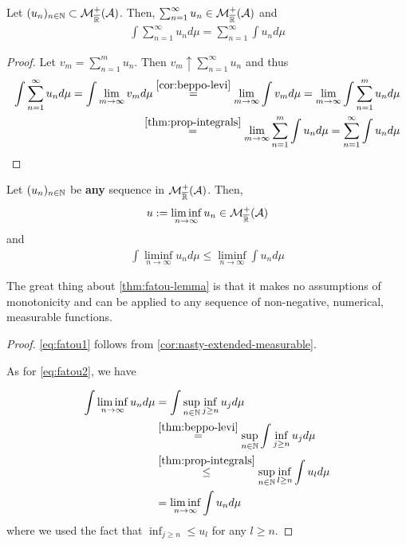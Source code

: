\begin{cor}
	\label{cor:integral-countable-sum}
	Let $(u_n)_{n\in\mathbb{N}} \subset \mathcal{M}^+_{\overline{\mathbb{R}}}(\mathcal{A})$. Then, $\sum_{n = 1}^{\infty} u_n \in \mathcal{M}_{\overline{\mathbb{R}}}^+(\mathcal{A})$ and
	\begin{align}
		\int \sum_{n = 1}^\infty u_n d\mu = \sum_{n = 1}^\infty \int u_n d\mu
	\end{align}
\end{cor}

\begin{proof}
	Let $v_m = \sum_{n=1}^{m} u_n$. Then $v_m \uparrow \sum_{n=1}^{\infty} u_n$ and thus
	\begin{align*}
		\int \sum_{n = 1}^\infty u_n d\mu
		= \int \lim_{m \to \infty} v_m d\mu
		\overset{\ref{cor:beppo-levi}}{=} \lim_{m \to \infty} \int v_m d\mu
		= \lim_{m \to \infty} \int \sum_{n = 1}^m u_n d\mu \\
		\overset{\ref{thm:prop-integrals}}{=} \lim_{m \to \infty} \sum_{n=1}^{m} \int u_n d\mu
		= \sum_{n = 1}^\infty \int u_n d\mu
	\end{align*}
\end{proof}

\begin{thm}
	\label{thm:fatou-lemma}
	Let $(u_n)_{n\in\mathbb{N}}$ be \textbf{any} sequence in $\mathcal{M}_{\overline{\mathbb{R}}}^+(\mathcal{A})$. Then,
	\begin{align}
		\label{eq:fatou1}
		u := \liminf_{n\to \infty} u_n \in \mathcal{M}_{\overline{\mathbb{R}}}^+(\mathcal{A})
	\end{align}
	and
	\begin{align}
		\label{eq:fatou2}
		\int \liminf_{n\to \infty} u_n d\mu \leq \liminf_{n\to \infty} \int u_n d\mu
	\end{align}
\end{thm}

The great thing about \autoref{thm:fatou-lemma} is that it makes no assumptions of monotonicity and can be applied to any sequence of non-negative, numerical, measurable functions.

\begin{proof}
	\autoref{eq:fatou1} follows from \autoref{cor:nasty-extended-measurable}.
	
	As for \autoref{eq:fatou2}, we have
	
	\begin{align*}
		\int \liminf_{n\to \infty} u_n d\mu
		&= \int \sup_{n\in\mathbb{N}} \inf_{j \geq n} u_j d\mu \\
		&\overset{\ref{thm:beppo-levi}}{=} \sup_{n\in\mathbb{N}} \int \inf_{j \geq n} u_j d\mu \\
		&\overset{\ref{thm:prop-integrals}}{\leq} \sup_{n\in\mathbb{N}} \inf_{l \geq n} \int u_l d\mu\\
		&= \liminf_{n\to\infty} \int u_n d\mu
	\end{align*}
	where we used the fact that $\inf_{j \geq n} \leq u_l$ for any $l \geq n$.
\end{proof}

